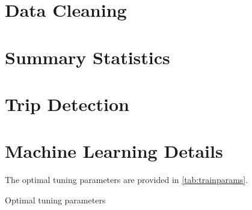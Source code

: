 \section{Data Cleaning}\label{app:MLDataCleaning}






\section{Summary Statistics}\label{app:summarystats}


\section{Trip Detection}\label{app:tripdetection}


\section{Machine Learning Details}\label{app:mldetails}

The optimal tuning parameters are provided in \autoref{tab:trainparams}.
\begin{table}[H]
    \centering
    \begin{adjustbox}{max width=\textwidth}
    \begin{threeparttable}
        \caption{Optimal tuning parameters}
        \label{tab:trainparams}
        
    \end{threeparttable}
    \end{adjustbox}
\end{table}


